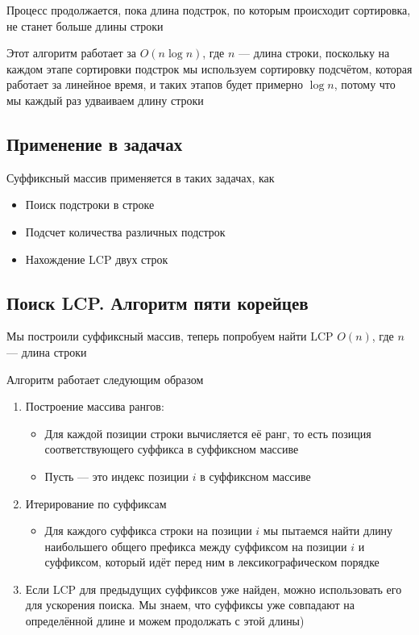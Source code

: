 \documentclass[a4paper]{article}
\begin{document}
Процесс продолжается, пока длина подстрок, по которым происходит сортировка, не станет больше длины строки

\difficulty Этот алгоритм работает за $O(n \log n)$, где $n$ — длина строки, поскольку на каждом этапе сортировки подстрок мы используем сортировку подсчётом, которая работает за линейное время, и таких этапов будет примерно $\log n$, потому что мы каждый раз удваиваем длину строки

\subsection{Применение в задачах}
Суффиксный массив применяется в таких задачах, как
\begin{itemize}
    \item Поиск подстроки в строке
    \item Подсчет количества различных подстрок
    \item Нахождение LCP двух строк
\end{itemize}

\subsection{Поиск LCP. Алгоритм пяти корейцев}
Мы построили суффиксный массив, теперь попробуем найти LCP
\difficulty $O(n)$, где $n$ — длина строки

Алгоритм работает следующим образом
\begin{enumerate}
    \item Построение массива рангов:
    \begin{itemize}
        \item Для каждой позиции строки вычисляется её ранг, то есть позиция соответствующего суффикса в суффиксном массиве
        \item Пусть  — это индекс позиции $i$ в суффиксном массиве
    \end{itemize}
    \item Итерирование по суффиксам
    \begin{itemize}
        \item Для каждого суффикса строки на позиции $i$ мы пытаемся найти длину наибольшего общего префикса между суффиксом на позиции $i$ и суффиксом, который идёт перед ним в лексикографическом порядке
    \end{itemize}
    \item Если LCP для предыдущих суффиксов уже найден, можно использовать его для ускорения поиска. Мы знаем, что суффиксы уже совпадают на определённой длине и можем продолжать с этой длины)
\end{enumerate}
\end{document}

